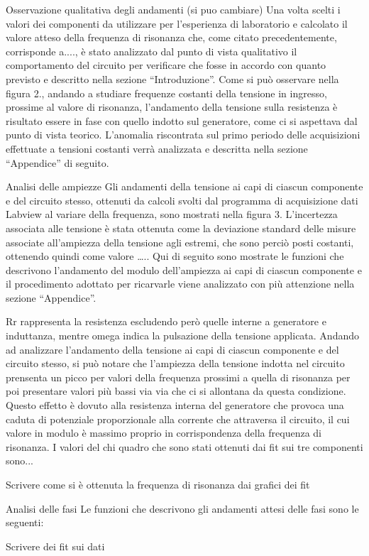 Osservazione qualitativa degli andamenti (si puo cambiare)
Una volta scelti i valori dei componenti da utilizzare per l’esperienza di laboratorio e calcolato il valore atteso della frequenza di risonanza che, come citato precedentemente, corrisponde a...., è stato analizzato dal punto di vista qualitativo il comportamento del circuito per verificare che fosse in accordo con quanto previsto e descritto nella sezione “Introduzione”.
Come si può osservare nella figura 2., andando a studiare frequenze costanti della tensione in ingresso, prossime al valore di risonanza, l’andamento della tensione sulla resistenza è risultato essere in fase con quello indotto sul generatore, come ci si aspettava dal punto di vista teorico.
L’anomalia riscontrata sul primo periodo delle acquisizioni effettuate a tensioni costanti verrà analizzata e descritta nella sezione “Appendice” di seguito.

Analisi delle ampiezze
Gli andamenti della tensione ai capi di ciascun componente e del circuito stesso, ottenuti da calcoli svolti dal programma di acquisizione dati Labview al variare della frequenza, sono mostrati nella figura 3.
L’incertezza associata alle tensione è stata ottenuta come la deviazione standard delle misure associate all’ampiezza della tensione agli estremi, che sono perciò posti costanti, ottenendo quindi come valore …..
Qui di seguito sono mostrate le funzioni che descrivono l’andamento del modulo dell’ampiezza ai capi di ciascun componente e il procedimento adottato per ricarvarle viene analizzato con più attenzione nella sezione “Appendice”.










Rr rappresenta la resistenza escludendo però quelle interne a generatore e induttanza, mentre omega indica la pulsazione della tensione applicata.
Andando ad analizzare l’andamento della tensione ai capi di ciascun componente e del circuito stesso, si può notare che l’ampiezza della tensione indotta nel circuito prensenta un picco per valori della frequenza prossimi a quella di risonanza per poi presentare valori più bassi via via che ci si allontana da questa condizione.
Questo effetto è dovuto alla resistenza interna del generatore che provoca una caduta di potenziale proporzionale alla corrente che attraversa il circuito, il cui valore in modulo è massimo proprio in corrispondenza della frequenza di risonanza.
I valori del chi quadro che sono stati ottenuti dai fit sui tre componenti sono...



Scrivere come si è ottenuta la frequenza di risonanza dai grafici dei fit







Analisi delle fasi
Le funzioni che descrivono gli andamenti attesi delle fasi sono le seguenti:









Scrivere dei fit sui dati


